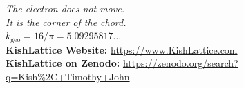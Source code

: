 \documentclass[11pt, letterpaper, openany]{book}
\begin{document}
\vfill
\begin{center}
\large
\textit{The electron does not move.}\\
\textit{It is the corner of the chord.}\\[1em]
\normalsize
$k_{\text{geo}} = 16/\pi = 5.09295817\ldots$\\[0.5em]
\small
\textbf{KishLattice Website:} \url{https://www.KishLattice.com}\\
\textbf{KishLattice on Zenodo:}
\url{https://zenodo.org/search?q=Kish\%2C+Timothy+John}
\end{center}
\end{document}

